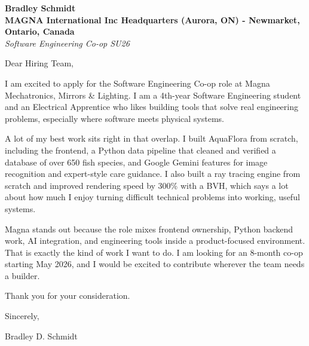 \documentclass[11pt]{article}
\begin{document}
\textbf{Bradley Schmidt}\\
\vspace{0.5em}
\textbf{MAGNA International Inc Headquarters (Aurora, ON) - Newmarket, Ontario, Canada}\\
\textit{Software Engineering Co-op SU26}

Dear Hiring Team,

\par

I am excited to apply for the Software Engineering Co-op role at Magna Mechatronics, Mirrors \& Lighting. I am a 4th-year Software Engineering student and an Electrical Apprentice who likes building tools that solve real engineering problems, especially where software meets physical systems.

\par

A lot of my best work sits right in that overlap. I built AquaFlora from scratch, including the frontend, a Python data pipeline that cleaned and verified a database of over 650 fish species, and Google Gemini features for image recognition and expert-style care guidance. I also built a ray tracing engine from scratch and improved rendering speed by 300\% with a BVH, which says a lot about how much I enjoy turning difficult technical problems into working, useful systems.

\par

Magna stands out because the role mixes frontend ownership, Python backend work, AI integration, and engineering tools inside a product-focused environment. That is exactly the kind of work I want to do. I am looking for an 8-month co-op starting May 2026, and I would be excited to contribute wherever the team needs a builder.

\par

Thank you for your consideration.

\par

Sincerely,

\par

Bradley D. Schmidt
\end{document}
